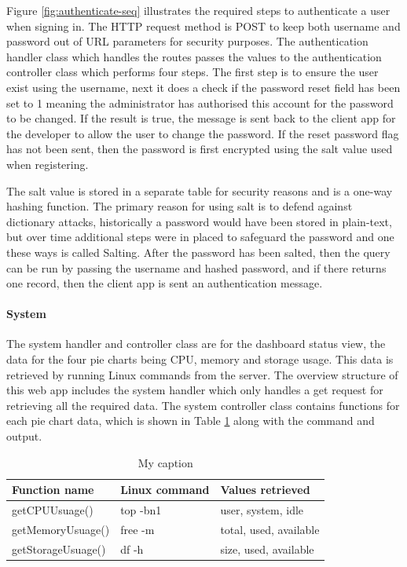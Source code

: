 Figure \ref{fig:authenticate-seq} illustrates the required steps to authenticate a user when signing in. The HTTP request method is POST to keep both username and password out of URL parameters for security purposes. The authentication handler class which handles the routes passes the values to the authentication controller class which performs four steps. The first step is to ensure the user exist using the username, next it does a check if the password reset field has been set to 1 meaning the administrator has authorised this account for the password to be changed. If the result is true, the message is sent back to the client app for the developer to allow the user to change the password. If the reset password flag has not been sent, then the password is first encrypted using the salt value used when registering.

The salt value is stored in a separate table for security reasons and is a one-way hashing function. The primary reason for using salt is to defend against dictionary attacks, historically a password would have been stored in plain-text, but over time additional steps were in placed to safeguard the password and one these ways is called Salting. After the password has been salted, then the query can be run by passing the username and hashed password, and if there returns one record, then the client app is sent an authentication message.

\paragraph{System}

The system handler and controller class are for the dashboard status view, the data for the four pie charts being CPU, memory and storage usage. This data is retrieved by running Linux commands from the server. The overview structure of this web app includes the system handler which only handles a get request for retrieving all the required data. The system controller class contains functions for each pie chart data, which is shown in Table \ref{tb:system} along with the command and output. 

\begin{table}[!h]
\centering
\caption{My caption}
\label{tb:system}
\begin{tabular}{|l|l|l|}
\hline
\rowcolor{green!20}
Function name    & Linux command & Values retrieved       \\ \hline
getCPUUsuage()     & top -bn1      & user, system, idle     \\ \hline
getMemoryUsuage()  & free -m       & total, used, available \\ \hline
getStorageUsuage() & df -h         & size, used, available  \\ \hline
\end{tabular}
\end{table}

